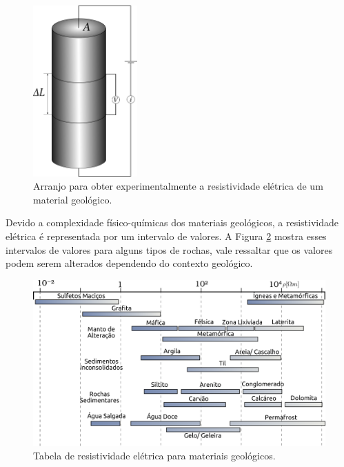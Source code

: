         \begin{figure}[H]
            \caption[Arranjo para obter a resistividade elétrica]{Arranjo para obter experimentalmente a resistividade elétrica de um material geológico.}
                \begin{center}
                    \includegraphics[width=4cm]{texto/figura/resisti_telford.png}
                \end{center}
            \label{arranjo-resistividade}
        \end{figure}
        
        Devido a complexidade físico-químicas dos materiais geológicos, a resistividade elétrica é representada por um intervalo de valores. A Figura \ref{tabela-resis} mostra esses intervalos de valores para alguns tipos de rochas, vale ressaltar que os valores podem serem alterados dependendo do contexto geológico. 
        
        \begin{figure}[H]
            \caption{Tabela de resistividade elétrica para materiais geológicos.}
                \begin{center}
                    \includegraphics[width=13cm]{texto/figura/resistividade_tabela.png}
                \end{center}
            \label{tabela-resis}
        \end{figure}
    
